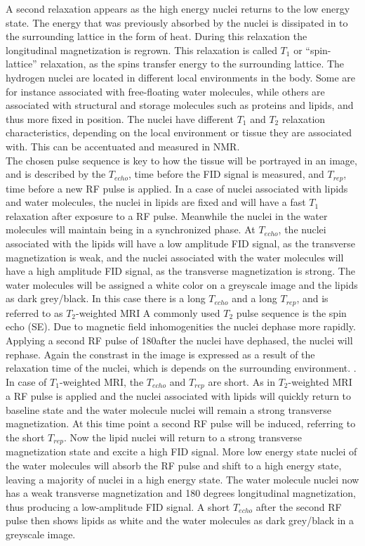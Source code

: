 A second relaxation appears as the high energy nuclei returns to the low energy state. The energy that was previously absorbed by the nuclei is dissipated in to the surrounding lattice in the form of heat. During this relaxation the longitudinal magnetization is regrown. This relaxation is called $T_1$ or “spin-lattice” relaxation, as the spins transfer energy to the surrounding lattice. \cite{Bharath2008}
The hydrogen nuclei are located in different local environments in the body. Some are for instance associated with free-floating water molecules, while others are associated with structural and storage molecules such as proteins and lipids, and thus more fixed in position. The nuclei have different $T_1$ and $T_2$ relaxation characteristics, depending on the local environment or tissue they are associated with. This can be accentuated and measured in NMR. \cite{Bharath2008} \\
The chosen pulse sequence is key to how the tissue will be portrayed in an image, and is described by the $T_{echo}$, time before the FID signal is measured, and $T_{rep}$, time before a new RF pulse is applied. In a case of nuclei associated with lipids and water molecules, the nuclei in lipids are fixed and will have a fast $T_1$ relaxation after exposure to a RF pulse. Meanwhile the nuclei in the water molecules will maintain being in a synchronized phase. At $T_{echo}$, the nuclei associated with the lipids will have a low amplitude FID signal, as the transverse magnetization is weak, and the nuclei associated with the water molecules will have a high amplitude FID signal, as the transverse magnetization is strong. The water molecules will be assigned a white color on a greyscale image and the lipids as dark grey/black. In this case there is a long $T_{echo}$ and a long $T_{rep}$, and is referred to as $T_2$-weighted MRI A commonly used $T_2$ pulse sequence is the spin echo (SE). Due to magnetic field inhomogenities the nuclei dephase more rapidly. Applying a second RF pulse of 180\degree after the nuclei have dephased, the nuclei will rephase. Again the constrast in the image is expressed as a result of the relaxation time of the nuclei, which is depends on the surrounding environment. . \cite{Bharath2008} \\
\setlength{\parindent}{0.2cm} In case of $T_1$-weighted MRI, the $T_{echo}$ and $T_{rep}$ are short. As in $T_2$-weighted MRI a RF pulse is applied and the nuclei associated with lipids will quickly return to baseline state and the water molecule nuclei will remain a strong transverse magnetization. At this time point a second RF pulse will be induced, referring to the short $T_{rep}$. Now the lipid nuclei will return to a strong transverse magnetization state and excite a high FID signal. More low energy state nuclei of the water molecules will absorb the RF pulse and shift to a high energy state, leaving a majority of nuclei in a high energy state. The water molecule nuclei now has a weak transverse magnetization and 180 degrees longitudinal magnetization, thus producing a low-amplitude FID signal. A short $T_{echo}$ after the second RF pulse then shows lipids as white and the water molecules as dark grey/black in a greyscale image. \cite{Bharath2008} \\
